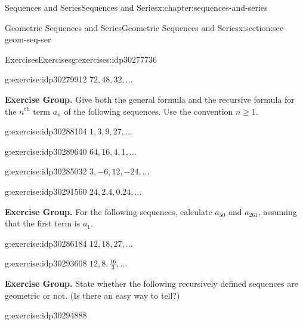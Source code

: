 \documentclass[twoside,10pt,]{book}
\numberwithin{equation}{section}
\newcommand{\nth}{{n^{\text{th}}}}
\begin{document}
\begin{chapterptx}{Sequences and Series}{}{Sequences and Series}{}{}{x:chapter:sequences-and-series}
\begin{sectionptx}{Geometric Sequences and Series}{}{Geometric Sequences and Series}{}{}{x:section:sec-geom-seq-ser}
\begin{exercises-subsection}{Exercises}{}{Exercises}{}{}{g:exercises:idp30277736}
\begin{exercisegroup}
\begin{divisionexerciseeg}{6}{}{}{g:exercise:idp30279912}%
\(72, 48, 32,\ldots\)\end{divisionexerciseeg}%
\end{exercisegroup}
\par\medskip\noindent
\par\medskip\noindent%
\textbf{Exercise Group.}\space\space%
Give both the general formula and the recursive formula for the \(\nth{}\) term \(a_n\) of the following sequences.  Use the convention \(n \ge 1\).\begin{exercisegroup}
\begin{divisionexerciseeg}{7}{}{}{g:exercise:idp30288104}%
\(1, 3, 9, 27, \ldots\)\end{divisionexerciseeg}%
\begin{divisionexerciseeg}{8}{}{}{g:exercise:idp30289640}%
\(64, 16, 4, 1, \ldots\)\end{divisionexerciseeg}%
\begin{divisionexerciseeg}{9}{}{}{g:exercise:idp30285032}%
\(3, -6, 12, -24, \ldots\)\end{divisionexerciseeg}%
\begin{divisionexerciseeg}{10}{}{}{g:exercise:idp30291560}%
\(24, 2.4, 0.24, \ldots\)\end{divisionexerciseeg}%
\end{exercisegroup}
\par\medskip\noindent
\par\medskip\noindent%
\textbf{Exercise Group.}\space\space%
For the following sequences, calculate \(a_{50}\) and \(a_{261}\), assuming that the first term is \(a_1\).\begin{exercisegroup}
\begin{divisionexerciseeg}{11}{}{}{g:exercise:idp30286184}%
\(12, 18, 27,\ldots\)\end{divisionexerciseeg}%
\begin{divisionexerciseeg}{12}{}{}{g:exercise:idp30293608}%
\(12, 8, \frac{{16}}{3}, \ldots\)\end{divisionexerciseeg}%
\end{exercisegroup}
\par\medskip\noindent
\par\medskip\noindent%
\textbf{Exercise Group.}\space\space%
State whether the following recursively defined sequences are geometric or not.  (Is there an easy way to tell?)\begin{exercisegroup}
\begin{divisionexerciseeg}{13}{}{}{g:exercise:idp30294888}%

\end{divisionexerciseeg}
\end{exercisegroup}
\end{exercises-subsection}
\end{sectionptx}
\end{chapterptx}
\end{document}
